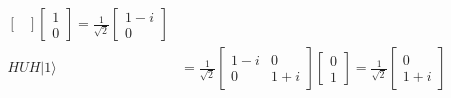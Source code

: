 \begin{align*}
\begin{bmatrix}
    \end{bmatrix}
    \begin{bmatrix}
        1\\
        0
    \end{bmatrix}
    = \frac{1}{\sqrt{2}}\begin{bmatrix}
        1 - i\\
        0
    \end{bmatrix}\\
    HUH|1\rangle &= \frac{1}{\sqrt{2}}\begin{bmatrix}
        1 - i & 0\\
        0 & 1 + i
    \end{bmatrix}
    \begin{bmatrix}
        0\\
        1
    \end{bmatrix}
    = \frac{1}{\sqrt{2}}\begin{bmatrix}
        0\\
        1 + i
    \end{bmatrix}
\end{align*}

